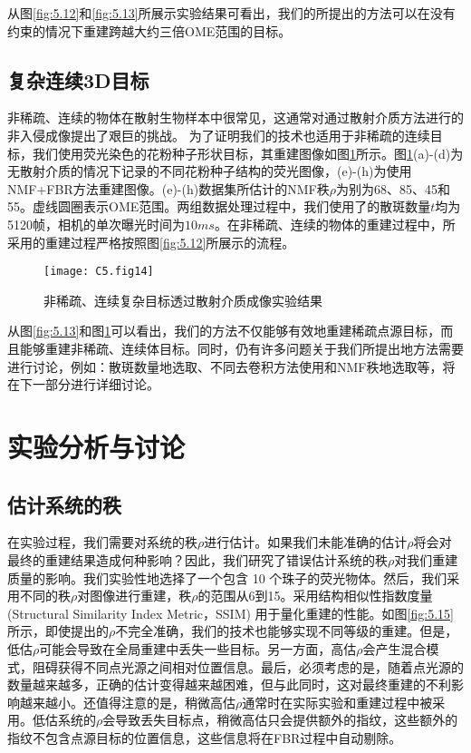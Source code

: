 从图\ref{fig:5.12}和\ref{fig:5.13}所展示实验结果可看出，我们的所提出的方法可以在没有约束的情况下重建跨越大约三倍OME范围的目标。

\subsection{复杂连续3D目标}

非稀疏、连续的物体在散射生物样本中很常见，这通常对通过散射介质方法进行的非入侵成像提出了艰巨的挑战。 为了证明我们的技术也适用于非稀疏的连续目标，我们使用荧光染色的花粉种子形状目标，其重建图像如图\ref{fig:5.14}所示。图\ref{fig:5.14}(a)-(d)为无散射介质的情况下记录的不同花粉种子结构的荧光图像，(e)-(h)为使用 NMF+FBR方法重建图像。(e)-(h)数据集所估计的NMF秩$\rho$为别为68、85、45和55。虚线圆圈表示OME范围。两组数据处理过程中，我们使用了的散斑数量$t$均为5120帧，相机的单次曝光时间为$10 ms$。在非稀疏、连续的物体的重建过程中，所采用的重建过程严格按照图\ref{fig:5.12}所展示的流程。

\begin{figure}[htp]
	\centering
	\texttt{[image: C5.fig14]}
	\caption{非稀疏、连续复杂目标透过散射介质成像实验结果}
	\label{fig:5.14}
\end{figure}

从图\ref{fig:5.13}和图\ref{fig:5.14}可以看出，我们的方法不仅能够有效地重建稀疏点源目标，而且能够重建非稀疏、连续体目标。同时，仍有许多问题关于我们所提出地方法需要进行讨论，例如：散斑数量地选取、不同去卷积方法使用和NMF秩地选取等，将在下一部分进行详细讨论。

\section{实验分析与讨论}

\subsection{估计系统的秩}
在实验过程，我们需要对系统的秩$\rho$进行估计。如果我们未能准确的估计$\rho$将会对最终的重建结果造成何种影响？因此，我们研究了错误估计系统的秩$\rho$对我们重建质量的影响。我们实验性地选择了一个包含 10 个珠子的荧光物体。然后，我们采用不同的秩$\rho$对图像进行重建，秩$\rho$的范围从6到15。采用结构相似性指数度量 (Structural Similarity Index Metric，SSIM) \cite{Daoud2017} 用于量化重建的性能。如图\ref{fig:5.15} 所示，即使提出的$\rho$不完全准确，我们的技术也能够实现不同等级的重建。但是，低估$\rho$可能会导致在全局重建中丢失一些目标。另一方面，高估$\rho$会产生混合模式，阻碍获得不同点光源之间相对位置信息。最后，必须考虑的是，随着点光源的数量越来越多，正确的估计变得越来越困难，但与此同时，这对最终重建的不利影响越来越小。还值得注意的是，稍微高估$\rho$通常时在实际实验和重建过程中被采用。低估系统的$\rho$会导致丢失目标点，稍微高估只会提供额外的指纹，这些额外的指纹不包含点源目标的位置信息，这些信息将在FBR过程中自动剔除。

